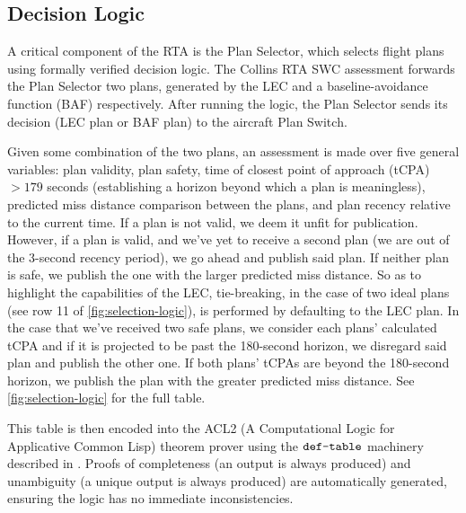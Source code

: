 \subsection{Decision Logic}




A critical component of the RTA is the Plan Selector, which selects flight plans using formally verified decision logic. The Collins RTA SWC assessment forwards the Plan Selector two plans, generated by the LEC and a baseline-avoidance function (BAF) respectively. After running the logic, the Plan Selector sends its decision (LEC plan or BAF plan) to the aircraft Plan Switch.


Given some combination of the two plans, an assessment is made over five general variables: plan validity, plan safety, time of closest point of approach (tCPA) $> 179$ seconds (establishing a horizon beyond which a plan is meaningless), predicted miss distance comparison between the plans, and plan recency relative to the current time. If a plan is not valid, we deem it unfit for publication. However, if a plan is valid, and we've yet to receive a second plan (we are out of the 3-second recency period), we go ahead and publish said plan. If neither plan is safe, we publish the one with the larger predicted miss distance. So as to highlight the capabilities of the LEC, tie-breaking, in the case of two ideal plans (see row 11 of \ref{fig:selection-logic}), is performed by defaulting to the LEC plan. In the case that we've received two safe plans, we consider each plans' calculated tCPA and if it is projected to be past the 180-second horizon, we disregard said plan and publish the other one. If both plans' tCPAs are beyond the 180-second horizon, we publish the plan with the greater predicted miss distance. See \ref{fig:selection-logic} for the full table.

This table is then encoded into the ACL2 (A Computational Logic for Applicative Common Lisp) theorem prover \cite{acl2} using the $\verb+def-table+$ machinery described in \cite{dasc2020}. Proofs of completeness (an output is always produced) and unambiguity (a unique output is always produced) are automatically generated, ensuring the logic has no immediate inconsistencies.

